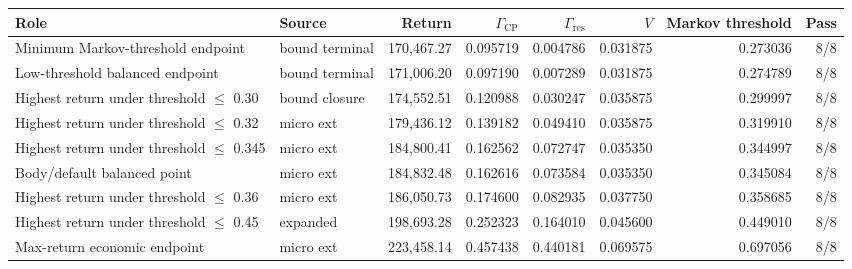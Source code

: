 \begin{tabular}{llrrrrrr}
\toprule
Role & Source & Return & $\Gamma_{\mathrm{CP}}$ & $\Gamma_{\mathrm{res}}$ & $V$ & Markov threshold & Pass \\
\midrule
Minimum Markov-threshold endpoint & bound terminal & 170,467.27 & 0.095719 & 0.004786 & 0.031875 & 0.273036 & 8/8 \\
Low-threshold balanced endpoint & bound terminal & 171,006.20 & 0.097190 & 0.007289 & 0.031875 & 0.274789 & 8/8 \\
Highest return under threshold $\leq$ 0.30 & bound closure & 174,552.51 & 0.120988 & 0.030247 & 0.035875 & 0.299997 & 8/8 \\
Highest return under threshold $\leq$ 0.32 & micro ext & 179,436.12 & 0.139182 & 0.049410 & 0.035875 & 0.319910 & 8/8 \\
Highest return under threshold $\leq$ 0.345 & micro ext & 184,800.41 & 0.162562 & 0.072747 & 0.035350 & 0.344997 & 8/8 \\
Body/default balanced point & micro ext & 184,832.48 & 0.162616 & 0.073584 & 0.035350 & 0.345084 & 8/8 \\
Highest return under threshold $\leq$ 0.36 & micro ext & 186,050.73 & 0.174600 & 0.082935 & 0.037750 & 0.358685 & 8/8 \\
Highest return under threshold $\leq$ 0.45 & expanded & 198,693.28 & 0.252323 & 0.164010 & 0.045600 & 0.449010 & 8/8 \\
Max-return economic endpoint & micro ext & 223,458.14 & 0.457438 & 0.440181 & 0.069575 & 0.697056 & 8/8 \\
\bottomrule
\end{tabular}

